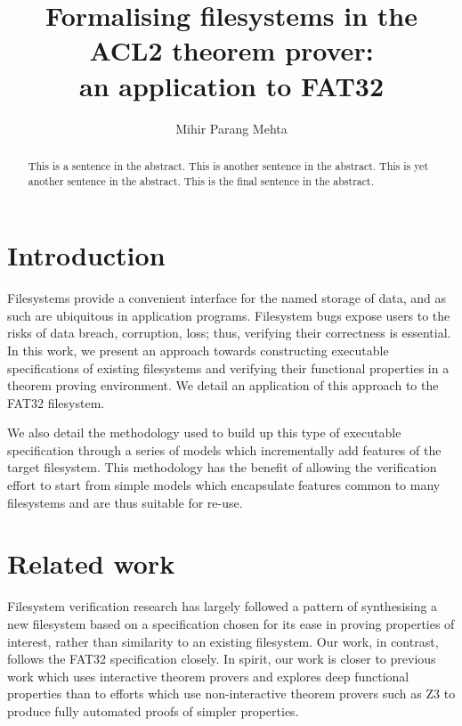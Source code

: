 \documentclass[submission,copyright,creativecommons]{eptcs}
\title{Formalising filesystems in the ACL2 theorem prover:\\ an
  application to FAT32}
\author{Mihir Parang Mehta
\institute{Department of Computer Science\\
University of Texas at Austin\\
Austin, TX, USA}
\email{mihir@cs.utexas.edu}}
\begin{document}
\maketitle

\begin{abstract}
This is a sentence in the abstract.
This is another sentence in the abstract.
This is yet another sentence in the abstract.
This is the final sentence in the abstract.
\end{abstract}

\section{Introduction}

Filesystems provide a convenient interface for the named storage of
data, and as such are ubiquitous in application programs. Filesystem
bugs expose users to the risks of data breach, corruption, loss; thus,
verifying their correctness is essential. In this work, we present an
approach towards constructing executable specifications of existing
filesystems and verifying their functional properties in a theorem
proving environment. We detail an application of this approach to the
FAT32 filesystem.

We also detail the methodology used to build up this type of
executable specification through a series of models which
incrementally add features of the target filesystem. This methodology
has the benefit of allowing the verification effort to start from
simple models which encapsulate features common to many filesystems
and are thus suitable for re-use.

\section{Related work}

Filesystem verification research has largely followed a pattern of
synthesising a new filesystem based on a specification chosen for its
ease in proving properties of interest, rather than similarity to an
existing filesystem. Our work, in contrast, follows the FAT32
specification closely. In spirit, our work is closer to previous work
which uses interactive theorem provers and explores deep functional
properties than to efforts which use non-interactive theorem provers
such as Z3 to produce fully automated proofs of simpler properties.
\end{document}
